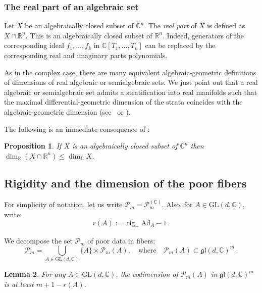\documentclass[10pt, a4paper]{amsart}
\theoremstyle{plain}
\newtheorem{lemma}{Lemma}[section]
\newtheorem{prop}[lemma]{Proposition}
\theoremstyle{definition}
\theoremstyle{remark}
\theoremstyle{note}
\numberwithin{equation}{section}
\begin{document}
\subsubsection{The real part of an algebraic set}

Let $X$ be an algebraically closed subset of ${\mathbb{C}}^n$.
The \emph{real part} of $X$ is defined as $X \cap {\mathbb{R}}^n$.
This is an algebraically closed subset of ${\mathbb{R}}^n$. 
Indeed, generators of the corresponding ideal $f_1,\ldots, f_k$ in ${\mathbb{C}}[T_1,\ldots, T_n]$ can be replaced by the corresponding real and imaginary parts polynomials.

As in the complex case, there are many equivalent algebraic-geometric definitions of dimensions of real algebraic or semialgebraic sets. We just point out that a real algebraic or semialgebraic set admits a stratification into real manifolds such that the maximal differential-geometric dimension of the strata coincides with the algebraic-geometric dimension (see~\cite[\S~3.4]{BR} or \cite[p.~50]{BCR}).

The following is an immediate consequence of \cite[Prop.~3.3.2]{BR}:

\begin{prop}\label{p.real complex dimension}
If $X$ is an algebraically closed subset of ${\mathbb{C}}^n$ then
$\dim_{\mathbb{R}} (X \cap {\mathbb{R}}^n) \le \dim_{\mathbb{C}} X$.
\end{prop}

\subsection{Rigidity and the dimension of the poor fibers}

For simplicity of notation, let us write ${\mathcal{P}}_m = {\mathcal{P}}_m^{({\mathbb{C}})}$.
Also, for $A \in {\mathrm{GL}}(d,{\mathbb{C}})$, write:
$$
r(A) := \operatorname{rig}_+ {\mathrm{Ad}}_A  - 1  \, .
$$

We decompose the set ${\mathcal{P}}_m$ of poor data in fibers:
\begin{equation}\label{e.fiber decomp}
{\mathcal{P}}_m = \bigcup_{A \in {\mathrm{GL}}(d,{\mathbb{C}})} \{A\} \times {\mathcal{P}}_m(A),
\quad \text{where} \quad
{\mathcal{P}}_m(A) \subset {\mathfrak{gl}}(d,{\mathbb{C}})^m \, .
\end{equation}

\begin{lemma}\label{l.cod fiber}
For any $A \in {\mathrm{GL}}(d,{\mathbb{C}})$, 
the codimension of ${\mathcal{P}}_m(A)$ in ${\mathfrak{gl}}(d,{\mathbb{C}})^m$
is at least $m + 1 - r(A)$.  
\end{lemma}
\end{document}
